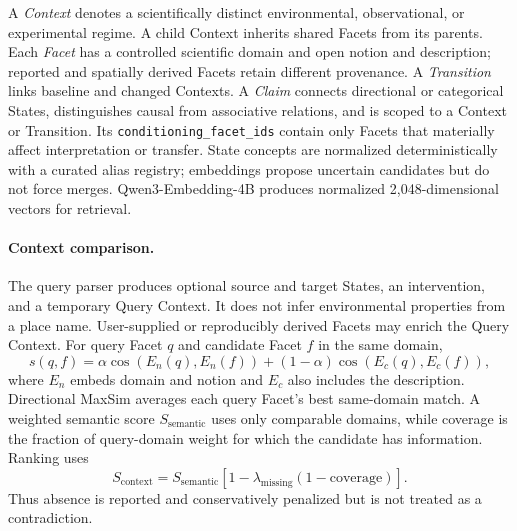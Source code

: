 \documentclass{article}
\begin{document}
A \emph{Context} denotes a scientifically distinct environmental,
observational, or experimental regime. A child Context inherits shared Facets
from its parents. Each \emph{Facet} has a controlled scientific domain and open
notion and description; reported and spatially derived Facets retain different
provenance. A \emph{Transition} links baseline and changed Contexts. A
\emph{Claim} connects directional or categorical States, distinguishes causal
from associative relations, and is scoped to a Context or Transition. Its
\texttt{conditioning\_facet\_ids} contain only Facets that materially affect
interpretation or transfer. State concepts are normalized deterministically
with a curated alias registry; embeddings propose uncertain candidates but do
not force merges. Qwen3-Embedding-4B produces normalized 2,048-dimensional
vectors for retrieval.

\paragraph{Context comparison.}
The query parser produces optional source and target States, an intervention,
and a temporary Query Context. It does not infer environmental properties from
a place name. User-supplied or reproducibly derived Facets may enrich the Query
Context. For query Facet $q$ and candidate Facet $f$ in the same domain,
\begin{equation}
s(q,f)=\alpha\cos(E_n(q),E_n(f))+(1-\alpha)\cos(E_c(q),E_c(f)),
\end{equation}
where $E_n$ embeds domain and notion and $E_c$ also includes the description.
Directional MaxSim averages each query Facet's best same-domain match. A
weighted semantic score $S_{\mathrm{semantic}}$ uses only comparable domains,
while coverage is the fraction of query-domain weight for which the candidate
has information. Ranking uses
\begin{equation}
S_{\mathrm{context}}=S_{\mathrm{semantic}}
\left[1-\lambda_{\mathrm{missing}}(1-\mathrm{coverage})\right].
\end{equation}
Thus absence is reported and conservatively penalized but is not treated as a
contradiction.
\end{document}
